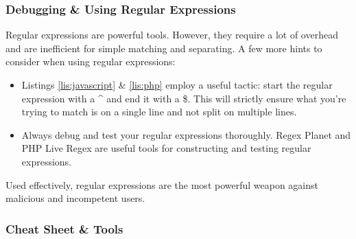 \documentclass[aspectratio=169]{beamer}
\begin{document}
\begin{frame}
\frametitle{Debugging \& Using Regular Expressions}
Regular expressions are powerful tools. However, they require a lot of overhead and are inefficient for simple matching and separating. A few more hints to consider when using regular expressions:
\begin{itemize}
	\item Listings \ref{lis:javascript} \& \ref{lis:php} employ a useful tactic: start the regular expression with a \textasciicircum \mbox{} and end it with a \$. This will strictly ensure what you're trying to match is on a single line and not split on multiple lines.
	\item Always debug and test your regular expressions thoroughly. Regex Planet and PHP Live Regex are useful tools for constructing and testing regular expressions. \cite{regex101, phpliveregex}
\end{itemize}
Used effectively, regular expressions are the most powerful weapon against malicious and incompetent users.
\end{frame}

\begin{frame}
\frametitle{Cheat Sheet \& Tools}

\end{frame}
\end{document}
